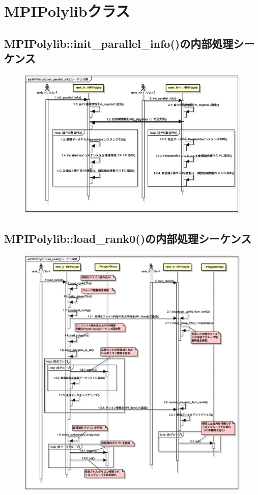 {\pagebreak
%
\section{MPIPolylibクラス}

%
\subsection{MPIPolylib::init\_parallel\_info()の内部処理シーケンス}

\begin{figure}[H]
 \centering
 \includegraphics[width=16cm]{clip016.eps}
\end{figure}


\pagebreak
%
\subsection{MPIPolylib::load\_rank0()の内部処理シーケンス}

\begin{figure}[H]
 \centering
 \includegraphics[width=16cm]{clip017.eps}
\end{figure}


}
